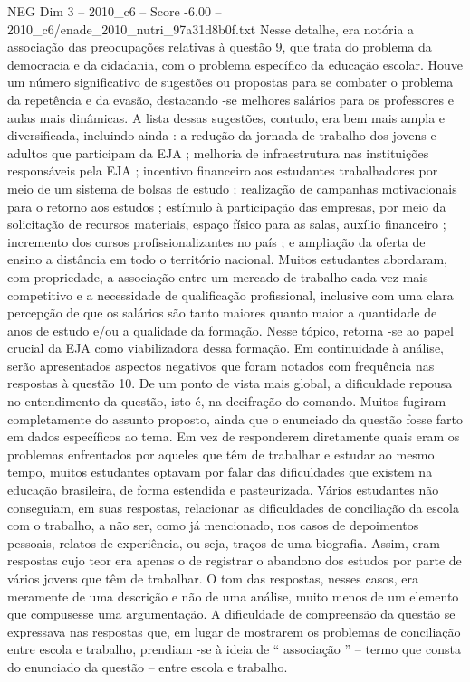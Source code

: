 \begin{textsample}{NEG Dim 3 – 2010\_c6 – Score -6.00 – 2010\_c6/enade\_2010\_nutri\_97a31d8b0f.txt}
Nesse detalhe, era notória a associação das preocupações relativas à questão 9, que trata do problema da democracia e da cidadania, com o problema específico da educação escolar.
Houve um número significativo de sugestões ou propostas para se combater o problema da repetência e da evasão, destacando -se melhores salários para os professores e aulas mais dinâmicas.
A lista dessas sugestões, contudo, era bem mais ampla e diversificada, incluindo ainda : a redução da jornada de trabalho dos jovens e adultos que participam da EJA ; melhoria de infraestrutura nas instituições responsáveis pela EJA ; incentivo financeiro aos estudantes trabalhadores por meio de um sistema de bolsas de estudo ; realização de campanhas motivacionais para o retorno aos estudos ; estímulo à participação das empresas, por meio da solicitação de recursos materiais, espaço físico para as salas, auxílio financeiro ; incremento dos cursos profissionalizantes no país ; e ampliação da oferta de ensino a distância em todo o território nacional.
Muitos estudantes abordaram, com propriedade, a associação entre um mercado de trabalho cada vez mais competitivo e a necessidade de qualificação profissional, inclusive com uma clara percepção de que os salários são tanto maiores quanto maior a quantidade de anos de estudo e/ou a qualidade da formação.
Nesse tópico, retorna -se ao papel crucial da EJA como viabilizadora dessa formação.
Em continuidade à análise, serão apresentados aspectos negativos que foram notados com frequência nas respostas à questão 10.
De um ponto de vista mais global, a dificuldade repousa no entendimento da questão, isto é, na decifração do comando.
Muitos fugiram completamente do assunto proposto, ainda que o enunciado da questão fosse farto em dados específicos ao tema.
Em vez de responderem diretamente quais eram os problemas enfrentados por aqueles que têm de trabalhar e estudar ao mesmo tempo, muitos estudantes optavam por falar das dificuldades que existem na educação brasileira, de forma estendida e pasteurizada.
Vários estudantes não conseguiam, em suas respostas, relacionar as dificuldades de conciliação da escola com o trabalho, a não ser, como já mencionado, nos casos de depoimentos pessoais, relatos de experiência, ou seja, traços de uma biografia.
Assim, eram respostas cujo teor era apenas o de registrar o abandono dos estudos por parte de vários jovens que têm de trabalhar.
O tom das respostas, nesses casos, era meramente de uma descrição e não de uma análise, muito menos de um elemento que compusesse uma argumentação.
A dificuldade de compreensão da questão se expressava nas respostas que, em lugar de mostrarem os problemas de conciliação entre escola e trabalho, prendiam -se à ideia de “ associação ” – termo que consta do enunciado da questão – entre escola e trabalho.

\end{textsample}
